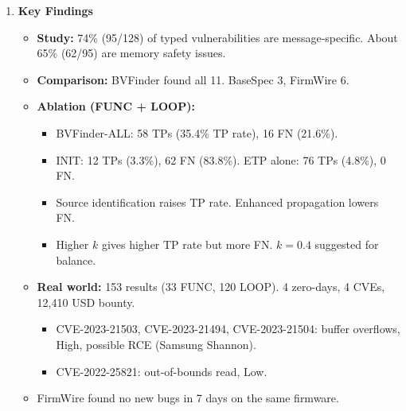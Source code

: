 \documentclass[11pt,a4paper]{article}
\newcommand{\entrypart}[1]{\textbf{\color{accent}#1}\par\vspace{2pt}}
\begin{document}
\begin{enumerate}
    \begin{itemize}
        \item \textbf{RQ1 (comparison):} 11 known message-specific vulnerabilities in three firmware images.
        \begin{itemize}
            \item Images: G9250CHC1BOGB, G930FXXU1APB4 and MT6762.
            \item CVE-2010-3832 excluded (Qualcomm Hexagon ISA not supported).
        \end{itemize}
        \item \textbf{Baseline comparison:} BaseSpec (results taken from its paper) and FirmWire (24 h fuzzing per task).
        \item \textbf{RQ2 (ablation):} G930FXXU1APB4. Variants INIT, STI, ETP, ALL. Ground truth from manual marking of the union of 1,547 results (one man-month): 74 TPs.
        \item \textbf{RQ3 (real world):} latest firmware of Galaxy A50, Galaxy S10 (Samsung) and Galaxy A10s (MediaTek).
        \item \textbf{Metrics:} TP, FN, TP rate, time.
        \item \textbf{Setup:} Intel i7-11700, 128GB RAM.
    \end{itemize}

    \item \entrypart{Key Findings}

    \begin{itemize}
        \item \textbf{Study:} 74\% (95/128) of typed vulnerabilities are message-specific. About 65\% (62/95) are memory safety issues.
        \item \textbf{Comparison:} BVFinder found all 11. BaseSpec 3, FirmWire 6.
        \item \textbf{Ablation (FUNC + LOOP):}
        \begin{itemize}
            \item BVFinder-ALL: 58 TPs (35.4\% TP rate), 16 FN (21.6\%).
            \item INIT: 12 TPs (3.3\%), 62 FN (83.8\%). ETP alone: 76 TPs (4.8\%), 0 FN.
            \item Source identification raises TP rate. Enhanced propagation lowers FN.
            \item Higher $k$ gives higher TP rate but more FN. $k = 0.4$ suggested for balance.
        \end{itemize}
        \item \textbf{Real world:} 153 results (33 FUNC, 120 LOOP). 4 zero-days, 4 CVEs, 12,410 USD bounty.
        \begin{itemize}
            \item CVE-2023-21503, CVE-2023-21494, CVE-2023-21504: buffer overflows, High, possible RCE (Samsung Shannon).
            \item CVE-2022-25821: out-of-bounds read, Low.
        \end{itemize}
        \item FirmWire found no new bugs in 7 days on the same firmware.
    \end{itemize}


\end{enumerate}
\end{document}

